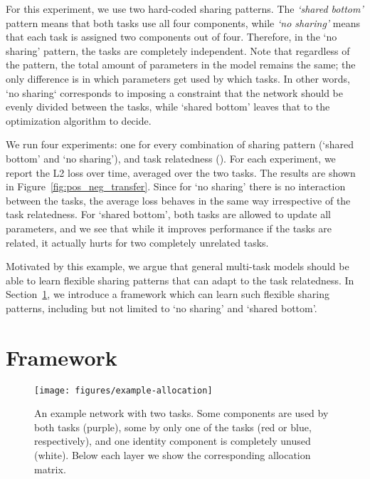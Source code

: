 \documentclass[conference]{IEEEtran}
\begin{document}
For this experiment, we use two hard-coded sharing patterns. The \textit{`shared bottom'} pattern means that both tasks use all four components, while \textit{`no sharing'} means that each task is assigned two components out of four. Therefore, in the `no sharing' pattern, the tasks are completely independent.
Note that regardless of the pattern, the total amount of parameters in the  model remains the same; the only difference is in which parameters get used by which tasks. In other words, `no sharing` corresponds to imposing a constraint that the network should be evenly divided between the tasks, while `shared bottom' leaves that to the optimization algorithm to decide.


We run four experiments: one for every combination of sharing pattern (`shared bottom' and `no sharing'), and task relatedness (). For each experiment, we report the L2 loss over time, averaged over the two tasks. The results are shown in Figure~\ref{fig:pos_neg_transfer}. Since for `no sharing' there is no interaction between the tasks, the average loss behaves in the same way irrespective of the task relatedness. For `shared bottom', both tasks are allowed to update all parameters, and we see that while it improves performance if the tasks are related, it actually hurts for two completely unrelated tasks.

Motivated by this example, we argue that general multi-task models should be able to learn flexible sharing patterns that can adapt to the task relatedness. In Section~\ref{sec:proposed_framework}, we introduce a framework which can learn such flexible sharing patterns, including but not limited to `no sharing' and `shared bottom'.


\section{Framework}\label{sec:proposed_framework}

\begin{figure*}[!t]
\begin{center}
\texttt{[image: figures/example-allocation]}
\end{center}
\caption{An example network with two tasks. Some components are used by both tasks (purple), some by only one of the tasks (red or blue, respectively), and one identity component is completely unused (white). Below each layer we show the corresponding allocation matrix.}\label{fig:routing_model_specific}
\end{figure*}
\end{document}
